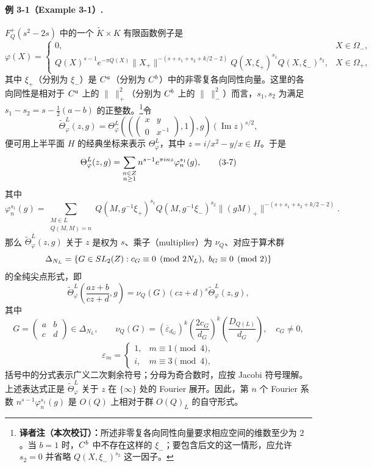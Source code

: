 \paragraph*{例 3-1（Example 3-1）.}
$F_Q^+(s^2-2s)$ 中的一个 $\widetilde K\times K$ 有限函数例子是
\begin{equation}
 \varphi(X)=\begin{cases}
 0,&X\in\Omega_-,\\
 Q(X)^{s-1}e^{-\pi Q(X)}\|X_+\|^{-(s+s_1+s_2+k/2-2)}
 Q(X,\xi_+)^{s_1}Q(X,\xi_-)^{s_2},&X\in\Omega_+,
 \end{cases}\tag{3-5}
\end{equation}
其中 $\xi_+$（分别为 $\xi_-$）是 $C^a$（分别为 $C^b$）中的非零复各向同性向量。这里的各向同性是相对于 $C^a$ 上的 $\|\ \|_+^2$（分别为 $C^b$ 上的 $\|\ \|_-^2$）而言，$s_1,s_2$ 为满足 $s_1-s_2=s-\tfrac12(a-b)$ 的正整数。\footnote{\textbf{译者注（本次校订）：}所述非零复各向同性向量要求相应空间的维数至少为 $2$。当 $b=1$ 时，$C^b$ 中不存在这样的 $\xi_-$；要包含后文的这一情形，应允许 $s_2=0$ 并省略 $Q(X,\xi_-)^{s_2}$ 这一因子。}令
\begin{equation}
 \widetilde\Theta_\varphi^L(z,g)
 =\Theta_\varphi^L\!\left(\left(\begin{pmatrix}x&y\\0&x^{-1}\end{pmatrix},1\right),g\right)
 (\operatorname{Im}z)^{s/2},\tag{3-6}
\end{equation}
便可用上半平面 $H$ 的经典坐标来表示 $\Theta_\varphi^L$，其中 $z=i/x^2-y/x\in H$。于是
\begin{equation}
 \Theta_\varphi^L(z,g)
 =\sum_{\substack{n\in Z\\n\ge1}}n^{s-1}e^{\pi inz}\varphi_n^{s_1}(g),\tag{3-7}
\end{equation}
其中
\[
 \varphi_n^{s_1}(g)=\sum_{\substack{M\in L\\Q(M,M)=n}}
 Q(M,g^{-1}\xi_+)^{s_1}Q(M,g^{-1}\xi_-)^{s_2}
 \|(gM)_+\|^{-(s+s_1+s_2+k/2-2)}.
\]
那么 $\widetilde\Theta_\varphi^L(z,g)$ 关于 $z$ 是权为 $s$、乘子（multiplier）为 $\nu_Q$、对应于算术群
\[
 \Delta_{N_L}=\{G\in\operatorname{SL}_2(\Z):c_G\equiv0\pmod{2N_L},\ b_G\equiv0\pmod2\}
\]
的全纯尖点形式，即
\begin{equation}
 \widetilde\Theta_\varphi^L\!\left(\frac{az+b}{cz+d},g\right)
 =\nu_Q(G)(cz+d)^s\widetilde\Theta_\varphi^L(z,g),\tag{3-8}
\end{equation}
其中
\[
 G=\begin{pmatrix}a&b\\c&d\end{pmatrix}\in\Delta_{N_L},\qquad
 \nu_Q(G)=(\overline\varepsilon_{d_G})^k
 \left(\frac{2c_G}{d_G}\right)^k\left(\frac{D_{Q(L)}}{d_G}\right),\quad c_G\ne0,
\]
\[
 \varepsilon_m=\begin{cases}1,&m\equiv1\pmod4,\\i,&m\equiv3\pmod4,\end{cases}
\]
括号中的分式表示广义二次剩余符号；分母为奇合数时，应按 Jacobi 符号理解。上述表达式正是 $\widetilde\Theta_\varphi^L$ 关于 $z$ 在 $\{\infty\}$ 处的 Fourier 展开。因此，第 $n$ 个 Fourier 系数 $n^{s-1}\varphi_n^{s_1}(g)$ 是 $O(Q)$ 上相对于群 $O(Q)_L$ 的自守形式。

